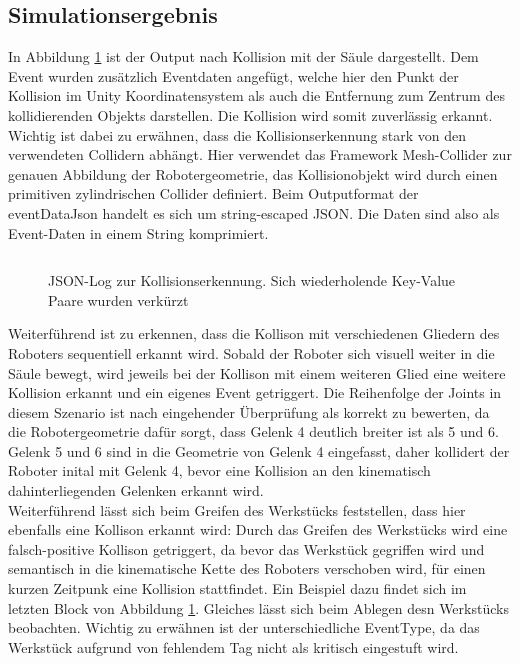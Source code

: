 \subsection{Simulationsergebnis}

In Abbildung \ref{listing:collisiondetectionerror} ist der Output nach Kollision
mit der Säule dargestellt. Dem Event wurden zusätzlich Eventdaten angefügt,
welche hier den Punkt der Kollision im Unity Koordinatensystem als auch die
Entfernung zum Zentrum des kollidierenden Objekts darstellen. Die Kollision wird
somit zuverlässig erkannt. Wichtig ist dabei zu erwähnen, dass die
Kollisionserkennung stark von den verwendeten Collidern abhängt. Hier verwendet
das Framework Mesh-Collider zur genauen Abbildung der Robotergeometrie, das
Kollisionobjekt wird durch einen primitiven zylindrischen Collider definiert.
Beim Outputformat der eventDataJson handelt es sich um string-escaped JSON. Die
Daten sind also als Event-Daten in einem String komprimiert.\\

\begin{figure}[H]
  \inputminted[fontsize=\footnotesize]{json}{code-snippets/collisiondetection.json}
  \caption{JSON-Log zur Kollisionserkennung. Sich wiederholende
    Key-Value Paare wurden
  verkürzt}
  \label{listing:collisiondetectionerror}
\end{figure}

 
Weiterführend ist zu erkennen, dass die Kollison mit verschiedenen Gliedern des
Roboters sequentiell erkannt wird. Sobald der Roboter sich visuell weiter in die
Säule bewegt, wird jeweils bei der Kollison mit einem weiteren Glied eine
weitere Kollision erkannt und ein eigenes Event getriggert. Die Reihenfolge der
Joints in diesem Szenario ist nach eingehender Überprüfung als korrekt zu
bewerten, da die Robotergeometrie dafür sorgt, dass Gelenk 4 deutlich breiter
ist als 5 und 6. Gelenk 5 und 6 sind in die Geometrie von Gelenk 4 eingefasst,
daher kollidert der Roboter inital mit Gelenk 4, bevor eine Kollision an den
kinematisch dahinterliegenden Gelenken erkannt wird.\\

  Weiterführend lässt sich beim Greifen des Werkstücks feststellen, dass
hier ebenfalls eine Kollison erkannt wird: Durch das Greifen des Werkstücks wird
eine falsch-positive Kollison getriggert, da bevor das Werkstück gegriffen wird
und semantisch in die kinematische Kette des Roboters verschoben wird, für einen
kurzen Zeitpunk eine Kollision stattfindet. Ein Beispiel dazu findet sich im
letzten Block von Abbildung \ref{listing:collisiondetectionerror}. Gleiches
lässt sich beim Ablegen desn Werkstücks beobachten. Wichtig zu erwähnen ist der
unterschiedliche EventType, da das Werkstück aufgrund von fehlendem Tag nicht
als kritisch eingestuft wird.


